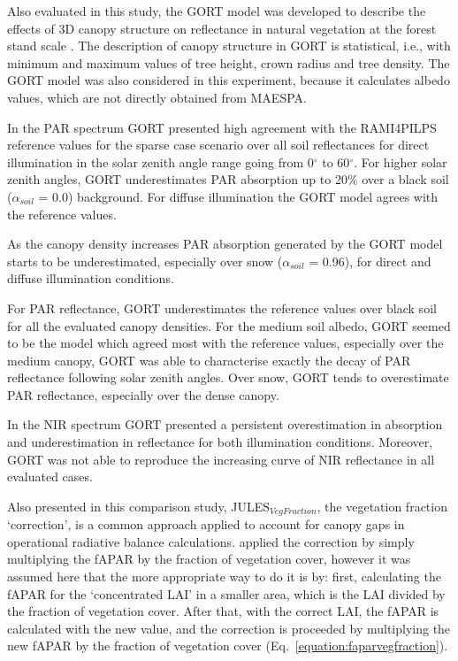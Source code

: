 \documentclass[a4paper,11pt]{report}
\begin{document}
Also evaluated in this study, the GORT model was developed to describe the effects of 3D canopy structure on reflectance in natural vegetation at the forest stand scale \citep{Ni1999}. The description of canopy structure in GORT is statistical, i.e., with minimum and maximum values of tree height, crown radius and tree density. The GORT model was also considered in this experiment, because it calculates albedo values, which are not directly obtained from MAESPA.

In the PAR spectrum GORT presented high agreement with the RAMI4PILPS reference values for the sparse case scenario over all soil reflectances for direct illumination in the solar zenith angle range going from 0$^{\circ}$ to 60$^{\circ}$. For higher solar zenith angles, GORT underestimates PAR absorption up to 20\% over a black soil ($\alpha_{soil}$ = 0.0) background. For diffuse illumination the GORT model agrees with the reference values. 

As the canopy density increases PAR absorption generated by the GORT model starts to be underestimated, especially over snow ($\alpha_{soil}$ = 0.96), for direct and diffuse illumination conditions.

For PAR reflectance, GORT underestimates the reference values over black soil for all the evaluated canopy densities. For the medium soil albedo, GORT seemed to be the model which agreed most with the reference values, especially over the medium canopy, GORT was able to characterise exactly the decay of PAR reflectance following solar zenith angles. Over snow, GORT tends to overestimate PAR reflectance, especially over the dense canopy.   

In the NIR spectrum GORT presented a persistent overestimation in absorption and underestimation in reflectance for both illumination conditions. Moreover, GORT was not able to reproduce the increasing curve of NIR reflectance in all evaluated cases.

Also presented in this comparison study, JULES$_{VegFraction}$, the vegetation fraction `correction', is a common approach applied to account for canopy gaps in operational radiative balance calculations. \citet{Loew2014} applied the correction by simply multiplying the fAPAR by the fraction of vegetation cover, however it was assumed here that the more appropriate way to do it is by: first, calculating the fAPAR for the `concentrated LAI' in a smaller area, which is the LAI divided by the fraction of vegetation cover. After that, with the correct LAI, the fAPAR is calculated with the new value, and the correction is proceeded by multiplying the new fAPAR by the fraction of vegetation cover (Eq.~\ref{equation:faparvegfraction}). 
\end{document}
